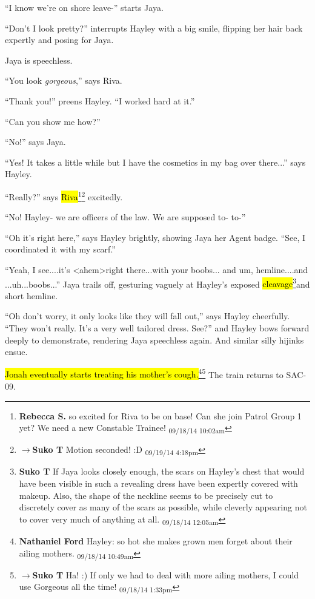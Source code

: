 ``I know we're on shore leave-'' starts Jaya.

``Don't I look pretty?'' interrupts Hayley with a big smile, flipping her hair back expertly and posing for Jaya.

Jaya is speechless.

``You look \textit{gorgeous},'' says Riva.

``Thank you!'' preens Hayley.  ``I worked hard at it.''

``Can you show me how?''

``No!'' says Jaya.

``Yes!  It takes a little while but I have the cosmetics in my bag over there...'' says Hayley.

``Really?'' says \hl{Riva}\footnote{\textbf{Rebecca S. }so excited for Riva to be on base! Can she join Patrol Group 1 yet? We need a new Constable Trainee! \textsubscript{09/18/14 10:02am}}\footnote{$\rightarrow$\textbf{Suko T }Motion seconded! :D \textsubscript{09/19/14 4:18pm}} excitedly.

``No!  Hayley- we are officers of the law. We are supposed to- to-''

``Oh it's right here,'' says Hayley brightly, showing Jaya her Agent badge.  ``See, I coordinated it with my scarf.''

``Yeah, I see....it's \textless ahem\textgreater  right there...with your boobs... and um, hemline....and ...uh...boobs...'' Jaya trails off, gesturing vaguely at Hayley's exposed \hl{cleavage}\footnote{\textbf{Suko T }If Jaya looks closely enough, the scars on Hayley's chest that would have been visible in such a revealing dress have been expertly covered with makeup.  Also, the shape of the neckline seems to be precisely cut to discretely cover as many of the scars as possible, while cleverly appearing not to cover very much of anything at all. \textsubscript{09/18/14 12:05am}}and short hemline.

``Oh don't worry, it only looks like they will fall out,'' says Hayley cheerfully.  ``They won't really.  It's a very well tailored dress. See?'' and Hayley bows forward deeply to demonstrate, rendering Jaya speechless again.  And similar silly hijinks ensue.



\hl{Jonah eventually starts treating his mother's cough.}\footnote{\textbf{Nathaniel Ford }Hayley: so hot she makes grown men forget about their ailing mothers. \textsubscript{09/18/14 10:49am}}\footnote{$\rightarrow$\textbf{Suko T }Ha! :)  If only we had to deal with more ailing mothers, I could use Gorgeous all the time! \textsubscript{09/18/14 1:33pm}}  The train returns to SAC-09.


